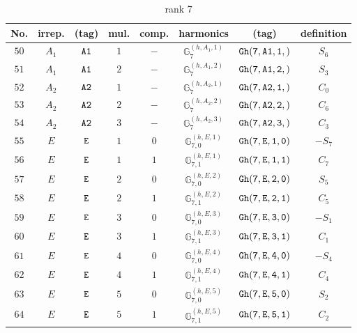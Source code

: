 \documentclass[fleqn,8pt]{jsarticle}
\begin{document}
\begin{table}[ht!]
\begin{center}
\caption{rank 7}
\renewcommand{\arraystretch}{1.3}
\begin{tabular}{cccccccc} \hline \hline
No. & irrep. & (tag) & mul. & comp. & harmonics & (tag) & definition \\ \hline
$ 50 $ & $ A_{1} $ & $ {\tt A1} $ & $ 1 $ & $ - $ & $ \mathbb{G}_{7}^{(h,A_{1},1)} $ & $ {\tt Gh(7,A1,1,)} $ & $ S_{6} $ \\
$ 51 $ & $ A_{1} $ & $ {\tt A1} $ & $ 2 $ & $ - $ & $ \mathbb{G}_{7}^{(h,A_{1},2)} $ & $ {\tt Gh(7,A1,2,)} $ & $ S_{3} $ \\
$ 52 $ & $ A_{2} $ & $ {\tt A2} $ & $ 1 $ & $ - $ & $ \mathbb{G}_{7}^{(h,A_{2},1)} $ & $ {\tt Gh(7,A2,1,)} $ & $ C_{0} $ \\
$ 53 $ & $ A_{2} $ & $ {\tt A2} $ & $ 2 $ & $ - $ & $ \mathbb{G}_{7}^{(h,A_{2},2)} $ & $ {\tt Gh(7,A2,2,)} $ & $ C_{6} $ \\
$ 54 $ & $ A_{2} $ & $ {\tt A2} $ & $ 3 $ & $ - $ & $ \mathbb{G}_{7}^{(h,A_{2},3)} $ & $ {\tt Gh(7,A2,3,)} $ & $ C_{3} $ \\
$ 55 $ & $ E $ & $ {\tt E} $ & $ 1 $ & $ 0 $ & $ \mathbb{G}_{7,0}^{(h,E,1)} $ & $ {\tt Gh(7,E,1,0)} $ & $ - S_{7} $ \\
$ 56 $ & $ E $ & $ {\tt E} $ & $ 1 $ & $ 1 $ & $ \mathbb{G}_{7,1}^{(h,E,1)} $ & $ {\tt Gh(7,E,1,1)} $ & $ C_{7} $ \\
$ 57 $ & $ E $ & $ {\tt E} $ & $ 2 $ & $ 0 $ & $ \mathbb{G}_{7,0}^{(h,E,2)} $ & $ {\tt Gh(7,E,2,0)} $ & $ S_{5} $ \\
$ 58 $ & $ E $ & $ {\tt E} $ & $ 2 $ & $ 1 $ & $ \mathbb{G}_{7,1}^{(h,E,2)} $ & $ {\tt Gh(7,E,2,1)} $ & $ C_{5} $ \\
$ 59 $ & $ E $ & $ {\tt E} $ & $ 3 $ & $ 0 $ & $ \mathbb{G}_{7,0}^{(h,E,3)} $ & $ {\tt Gh(7,E,3,0)} $ & $ - S_{1} $ \\
$ 60 $ & $ E $ & $ {\tt E} $ & $ 3 $ & $ 1 $ & $ \mathbb{G}_{7,1}^{(h,E,3)} $ & $ {\tt Gh(7,E,3,1)} $ & $ C_{1} $ \\
$ 61 $ & $ E $ & $ {\tt E} $ & $ 4 $ & $ 0 $ & $ \mathbb{G}_{7,0}^{(h,E,4)} $ & $ {\tt Gh(7,E,4,0)} $ & $ - S_{4} $ \\
$ 62 $ & $ E $ & $ {\tt E} $ & $ 4 $ & $ 1 $ & $ \mathbb{G}_{7,1}^{(h,E,4)} $ & $ {\tt Gh(7,E,4,1)} $ & $ C_{4} $ \\
$ 63 $ & $ E $ & $ {\tt E} $ & $ 5 $ & $ 0 $ & $ \mathbb{G}_{7,0}^{(h,E,5)} $ & $ {\tt Gh(7,E,5,0)} $ & $ S_{2} $ \\
$ 64 $ & $ E $ & $ {\tt E} $ & $ 5 $ & $ 1 $ & $ \mathbb{G}_{7,1}^{(h,E,5)} $ & $ {\tt Gh(7,E,5,1)} $ & $ C_{2} $ \\
 \hline \hline
\end{tabular}
\end{center}
\end{table}
\end{document}
